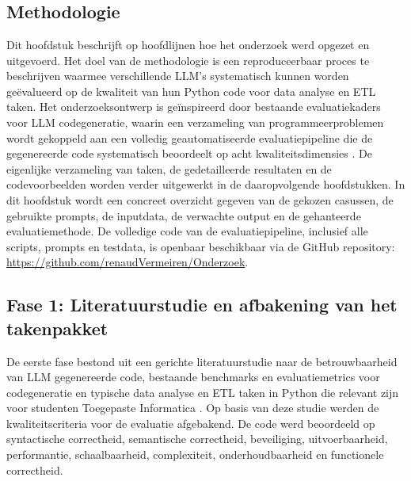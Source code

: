 
\chapter{}%
\label{ch:methodologie}

\section{Methodologie}%
\label{sec:methodologie}

Dit hoofdstuk beschrijft op hoofdlijnen hoe het onderzoek werd opgezet en uitgevoerd. Het doel van de methodologie is een reproduceerbaar proces te beschrijven waarmee verschillende LLM's systematisch kunnen worden geëvalueerd op de kwaliteit van hun Python code voor data analyse en ETL taken. Het onderzoeksontwerp is geïnspireerd door bestaande evaluatiekaders voor LLM codegeneratie, waarin een verzameling van programmeerproblemen wordt gekoppeld aan een volledig geautomatiseerde evaluatiepipeline die de gegenereerde code systematisch beoordeelt op acht kwaliteitsdimensies \autocite{Li2023,Ni2024,LopezEspejel2025}. De eigenlijke verzameling van taken, de gedetailleerde resultaten en de codevoorbeelden worden verder uitgewerkt in de daaropvolgende hoofdstukken. In dit hoofdstuk wordt een concreet overzicht gegeven van de gekozen casussen, de gebruikte prompts, de inputdata, de verwachte output en de gehanteerde evaluatiemethode. De volledige code van de evaluatiepipeline, inclusief alle scripts, prompts en testdata, is openbaar beschikbaar via de GitHub repository: \url{https://github.com/renaudVermeiren/Onderzoek}.

\section{Fase 1: Literatuurstudie en afbakening van het takenpakket}

De eerste fase bestond uit een gerichte literatuurstudie naar de betrouwbaarheid van LLM gegenereerde code, bestaande benchmarks en evaluatiemetrics voor codegeneratie en typische data analyse en ETL taken in Python die relevant zijn voor studenten Toegepaste Informatica \autocite{Li2023,Esfahani2024,Ni2024}. Op basis van deze studie werden de kwaliteitscriteria voor de evaluatie afgebakend. De code werd beoordeeld op syntactische correctheid, semantische correctheid, beveiliging, uitvoerbaarheid, performantie, schaalbaarheid, complexiteit, onderhoudbaarheid en functionele correctheid.

